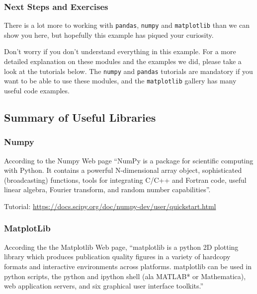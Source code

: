 \subsubsection{Next Steps and Exercises}\label{next-steps-and-exercises}

There is a lot more to working with \texttt{pandas}, \texttt{numpy} and
\texttt{matplotlib} than we can show you here, but hopefully this
example has piqued your curiosity.

Don't worry if you don't understand everything in this example. For a
more detailed explanation on these modules and the examples we did,
please take a look at the tutorials below. The \texttt{numpy} and
\texttt{pandas} tutorials are mandatory if you want to be able to use
these modules, and the \texttt{matplotlib} gallery has many useful code
examples.

\subsection{Summary of Useful
Libraries}\label{summary-of-useful-libraries}

\subsubsection{Numpy}\label{s:numpy}



According to the Numpy Web page ``NumPy is a package for scientific
computing with Python. It contains a powerful N-dimensional array
object, sophisticated (broadcasting) functions, tools for integrating
C/C++ and Fortran code, useful linear algebra, Fourier transform, and
random number capabilities''.

Tutorial:
\url{https://docs.scipy.org/doc/numpy-dev/user/quickstart.html}

\subsubsection{MatplotLib}\label{matplotlib}


According the the Matplotlib Web page, ``matplotlib is a python 2D
plotting library which produces publication quality figures in a variety
of hardcopy formats and interactive environments across platforms.
matplotlib can be used in python scripts, the python and ipython shell
(ala MATLAB* or Mathematica), web application servers, and six
graphical user interface toolkits.''

